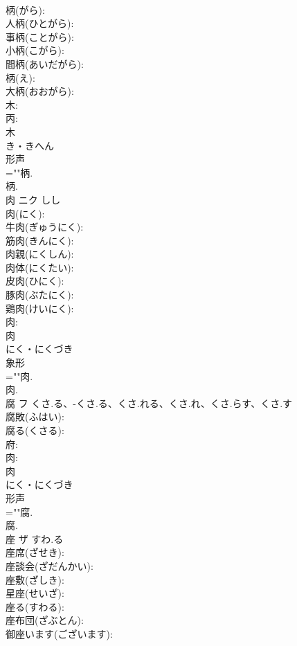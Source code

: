 \documentclass[8pt]{extreport}
\begin{document}
\begin{CJK}{UTF8}{min}
\\	柄(がら): 
\\	人柄(ひとがら): 
\\	事柄(ことがら): 
\\	小柄(こがら): 
\\	間柄(あいだがら): 
\\	柄(え): 
\\	大柄(おおがら): 
\\	木: 
\\	丙: 
\\	木	
\\	き・きへん	
\\	形声 
\\	=""柄.
\\	柄.
\\	肉	ニク	しし		
\\	肉(にく): 
\\	牛肉(ぎゅうにく): 
\\	筋肉(きんにく): 
\\	肉親(にくしん): 
\\	肉体(にくたい): 
\\	皮肉(ひにく): 
\\	豚肉(ぶたにく): 
\\	鶏肉(けいにく): 
\\	肉: 
\\	肉	
\\	にく・にくづき	
\\	象形 
\\	=""肉.
\\	肉.
\\	腐	フ	くさ.る、-くさ.る、くさ.れる、くさ.れ、くさ.らす、くさ.す		
\\	腐敗(ふはい): 
\\	腐る(くさる): 
\\	府: 
\\	肉: 
\\	肉	
\\	にく・にくづき	
\\	形声 
\\	=""腐.
\\	腐.
\\	座	ザ	すわ.る		
\\	座席(ざせき): 
\\	座談会(ざだんかい): 
\\	座敷(ざしき): 
\\	星座(せいざ): 
\\	座る(すわる): 
\\	座布団(ざぶとん): 
\\	御座います(ございます): 

\end{CJK}
\end{document}
